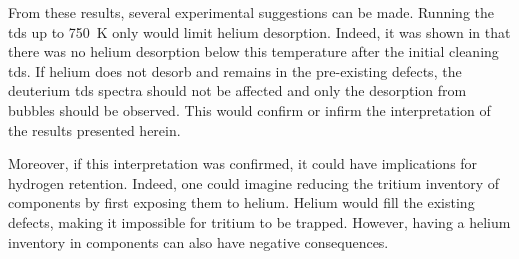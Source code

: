 From these results, several experimental suggestions can be made.
Running the \gls{tds} up to \SI{750}{K} only would limit helium desorption.
Indeed, it was shown in \cite{ialovega_hydrogen_2020} that there was no helium desorption below this temperature after the initial cleaning \gls{tds}.
If helium does not desorb and remains in the pre-existing defects, the deuterium \gls{tds} spectra should not be affected and only the desorption from bubbles should be observed.
This would confirm or infirm the interpretation of the results presented herein.

Moreover, if this interpretation was confirmed, it could have implications for hydrogen retention.
Indeed, one could imagine reducing the tritium inventory of components by first exposing them to helium.
Helium would fill the existing defects, making it impossible for tritium to be trapped.
However, having a helium inventory in components can also have negative consequences.
